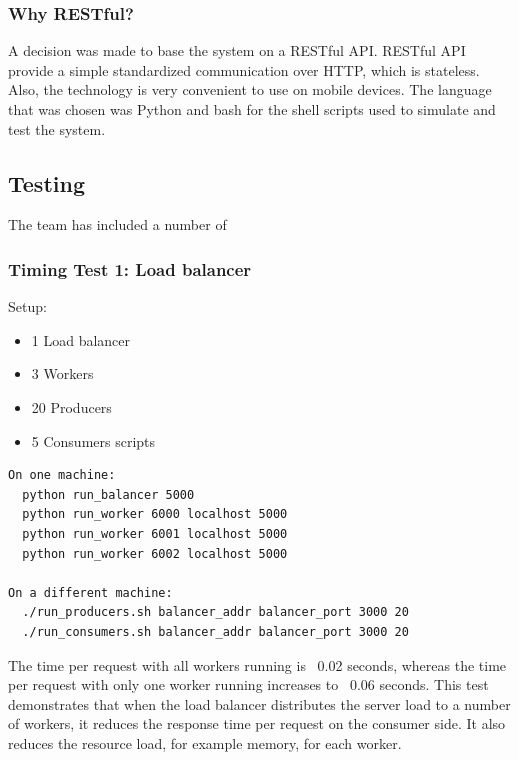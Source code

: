 \documentclass{sigchi}
\begin{document}
\subsubsection{Why RESTful?}

A decision was made to base the system on a RESTful API. RESTful API provide a simple standardized communication over HTTP, which is stateless. Also, the technology is very convenient to use on mobile devices. The language that was chosen was Python and bash for the shell scripts used to simulate and test the system. 

\subsection{Testing}

The team has included a number of 

\subsubsection{Timing Test 1: Load balancer}

Setup:

\begin{itemize}
  \item 1 Load balancer
  \item 3 Workers
  \item 20 Producers
  \item 5 Consumers scripts
\end{itemize}

\vspace*{\baselineskip}
\begin{lstlisting}[caption={Timing test 1: instructions}, mathescape, upquote=true]
On one machine:
  python run_balancer 5000
  python run_worker 6000 localhost 5000
  python run_worker 6001 localhost 5000
  python run_worker 6002 localhost 5000

On a different machine:
  ./run_producers.sh balancer_addr balancer_port 3000 20
  ./run_consumers.sh balancer_addr balancer_port 3000 20
\end{lstlisting}

The time per request with all workers running is ~0.02 seconds, whereas the time per request with only one worker running increases to ~0.06 seconds. This test demonstrates that when the load balancer distributes the server load to a number of workers, it reduces the response time per request on the consumer side. It also reduces the resource load, for example memory, for each worker.
\end{document}

